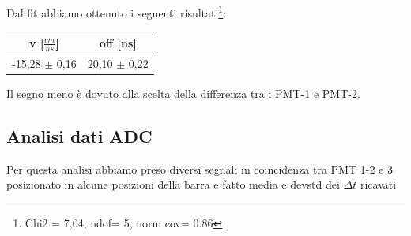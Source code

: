 \documentclass[a4paper]{article}
\begin{document}
Dal fit abbiamo ottenuto i seguenti risultati\footnote{Chi2 = 7,04, ndof= 5, norm cov= 0.86}:

\begin{tabular}{|c|c|}
\hline
v [$\frac{cm}{ns}$] & off [ns] \\
\hline
-15,28 $\pm$ 0,16 & 20,10 $\pm$ 0,22\\
\hline
\end{tabular}

Il segno meno è dovuto alla scelta della differenza tra i PMT-1 e PMT-2.

\subsection{Analisi dati ADC}
Per questa analisi abbiamo preso diversi segnali in coincidenza tra PMT 1-2 e 3 posizionato in alcune posizioni della barra e fatto media e devstd dei $\Delta t$ ricavati
\end{document}
